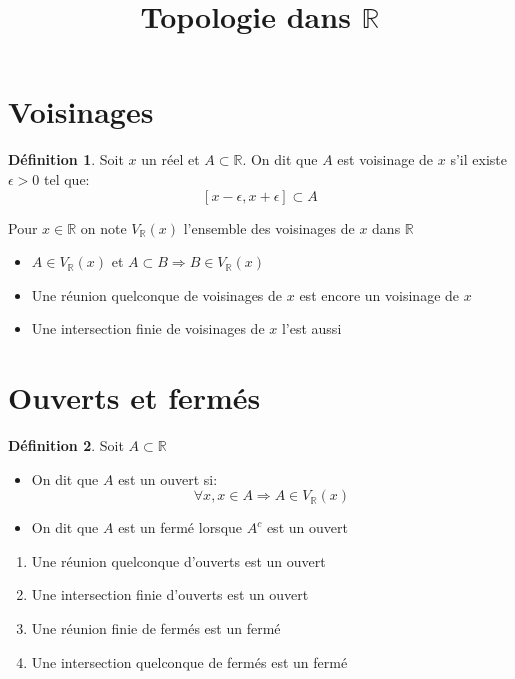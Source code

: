 \documentclass[fleqn]{article}
\title{Topologie dans $\mathbb{R}$}
\date{}
\theoremstyle{definition} \newtheorem*{defi}{D\'efinition}
\theoremstyle{definition} \newtheorem*{theo}{Th\'eor\`eme}
\theoremstyle{definition} \newtheorem*{adh}{Caract\'erisation s\'equentielle de l'adh\'erence}
\theoremstyle{definition} \newtheorem*{fermitude}{Caract\'erisation s\'equentielle de la fermitude}
\begin{document}
\maketitle

\section{Voisinages}
\begin{defi}
	Soit $x$ un r\'eel et $A \subset \mathbb{R}$. On dit que $A$ est voisinage de $x$ s'il existe $\epsilon > 0$ tel que:
	\[[x-\epsilon, x+\epsilon] \subset A\]
\end{defi}
Pour $x \in \mathbb{R}$ on note $V_\mathbb{R}(x)$ l'ensemble des voisinages de $x$ dans $\mathbb{R}$ \\
\begin{itemize}
	\item $A \in V_\mathbb{R}(x)$ et $A \subset B \Rightarrow B \in V_\mathbb{R}(x)$
	\item Une r\'eunion quelconque de voisinages de $x$ est encore un voisinage de $x$
	\item Une intersection finie de voisinages de $x$ l'est aussi
\end{itemize}

\section{Ouverts et ferm\'es}
\begin{defi}
	Soit $A \subset \mathbb{R}$
	\begin{itemize}
		\item On dit que $A$ est un ouvert si:
			\[\forall x, x \in A \Rightarrow A \in V_\mathbb{R}(x)\]
		\item On dit que $A$ est un ferm\'e lorsque $A^c$ est un ouvert \\
	\end{itemize}
\end{defi}
\begin{enumerate}
	\item Une r\'eunion quelconque d'ouverts est un ouvert
	\item Une intersection finie d'ouverts est un ouvert
	\item Une r\'eunion finie de ferm\'es est un ferm\'e
	\item Une intersection quelconque de ferm\'es est un ferm\'e
\end{enumerate}
\end{document}
